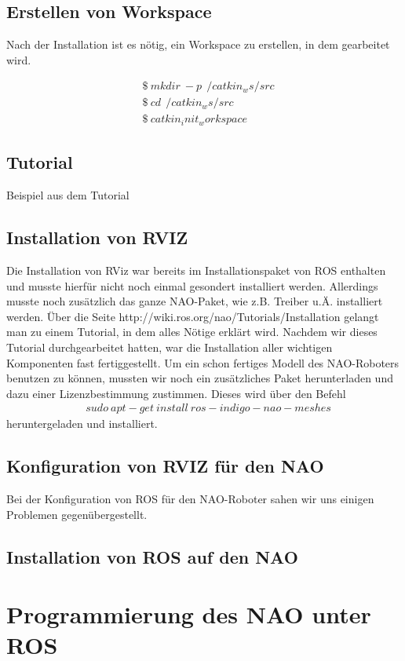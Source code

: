 \documentclass{scrartcl}
\begin{document}
\subsection{Erstellen von Workspace}

Nach der Installation ist es nötig, ein Workspace zu erstellen, in dem gearbeitet wird.

\begin{align}
&\$\ mkdir\ -p\ ~/catkin_ws/src\\
&\$\ cd\ ~/catkin_ws/src\\
&\$\ catkin_init_workspace
\end{align}
\subsection{Tutorial}
Beispiel aus dem Tutorial
\subsection{Installation von RVIZ}
Die Installation von RViz war bereits im Installationspaket von ROS enthalten und musste hierfür nicht noch einmal gesondert installiert werden. Allerdings musste noch zusätzlich das ganze NAO-Paket, wie z.B. Treiber u.Ä. installiert werden. Über die Seite http://wiki.ros.org/nao/Tutorials/Installation gelangt man zu einem Tutorial, in dem alles Nötige erklärt wird. Nachdem wir dieses Tutorial durchgearbeitet hatten, war die Installation aller wichtigen Komponenten fast fertiggestellt. Um ein schon fertiges Modell des NAO-Roboters benutzen zu können, mussten wir noch ein zusätzliches Paket herunterladen und dazu einer Lizenzbestimmung zustimmen. Dieses wird über den Befehl
\begin{align}
&sudo\ apt-get\ install\ ros-indigo-nao-meshes
\end{align}
heruntergeladen und installiert.
\subsection{Konfiguration von RVIZ für den NAO}
Bei der Konfiguration von ROS für den NAO-Roboter sahen wir uns einigen Problemen gegenübergestellt. 
\subsection{Installation von ROS auf den NAO}


\section{Programmierung des NAO unter ROS}
\end{document}
